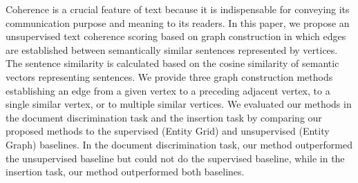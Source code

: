 Coherence is a crucial feature of text because it is indispensable for conveying its communication purpose and meaning to its readers. In this paper, we propose an unsupervised text coherence scoring based on graph construction in which edges are established between semantically similar sentences represented by vertices. The sentence similarity is calculated based on the cosine similarity of semantic vectors representing sentences. We provide three graph construction methods establishing an edge from a given vertex to a preceding adjacent vertex, to a single similar vertex, or to multiple similar vertices. We evaluated our methods in the document discrimination task and the insertion task by comparing our proposed methods to the supervised (Entity Grid) and unsupervised (Entity Graph) baselines. In the document discrimination task, our method outperformed the unsupervised baseline but could not do the supervised baseline, while in the insertion task, our method outperformed both baselines.
